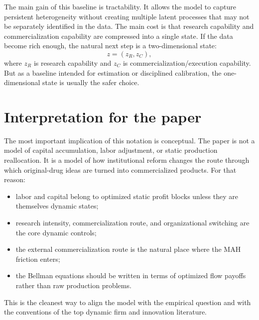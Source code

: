\documentclass[12pt]{article}
\begin{document}
The main gain of this baseline is tractability. It allows the model to capture persistent
heterogeneity without creating multiple latent processes that may not be separately
identified in the data. The main cost is that research capability and commercialization
capability are compressed into a single state. If the data become rich enough, the natural
next step is a two-dimensional state:
\[
z=(z_R,z_C),
\]
where $z_R$ is research capability and $z_C$ is commercialization/execution capability.
But as a baseline intended for estimation or disciplined calibration, the one-dimensional
state is usually the safer choice.

\section{Interpretation for the paper}

The most important implication of this notation is conceptual. The paper is not a model
of capital accumulation, labor adjustment, or static production reallocation. It is a model
of how institutional reform changes the route through which original-drug ideas are turned
into commercialized products. For that reason:

\begin{itemize}[leftmargin=2em]
    \item labor and capital belong to optimized static profit blocks unless they are themselves dynamic states;
    \item research intensity, commercialization route, and organizational switching are the core dynamic controls;
    \item the external commercialization route is the natural place where the MAH friction enters;
    \item the Bellman equations should be written in terms of optimized flow payoffs rather than raw production problems.
\end{itemize}

This is the cleanest way to align the model with the empirical question and with the
conventions of the top dynamic firm and innovation literature.
\end{document}
